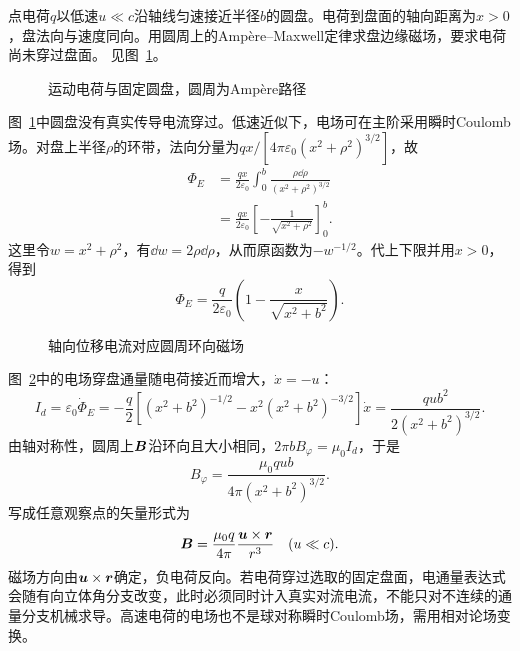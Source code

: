 \begin{example}[由位移电流求运动电荷的磁场]\label{ex:i4-e5}

点电荷$q$以低速$u\ll c$沿轴线匀速接近半径$b$的圆盘。电荷到盘面的轴向距离为$x>0$，盘法向与速度同向。用圆周上的Ampère--Maxwell定律求盘边缘磁场，要求电荷尚未穿过盘面。
 见图~\ref{fig:i4-e5-q}。
\end{example}

\begin{figure}[H]\centering
{}
\caption{运动电荷与固定圆盘，圆周为Ampère路径}\label{fig:i4-e5-q}
\end{figure}
\begin{solution}
图~\ref{fig:i4-e5-q}中圆盘没有真实传导电流穿过。低速近似下，电场可在主阶采用瞬时Coulomb场。对盘上半径$\rho$的环带，法向分量为$q x/[4\pi\varepsilon_0(x^2+\rho^2)^{3/2}]$，故
\[\begin{aligned}
\Phi_E&=\frac{qx}{2\varepsilon_0}\int_0^b
\frac{\rho\dd\rho}{(x^2+\rho^2)^{3/2}}\\
&=\frac{qx}{2\varepsilon_0}\left[-\frac1{\sqrt{x^2+\rho^2}}\right]_0^b.
\end{aligned}\]
这里令$w=x^2+\rho^2$，有$\dd w=2\rho\dd\rho$，从而原函数为$-w^{-1/2}$。代上下限并用$x>0$，得到
\[
\Phi_E=\frac q{2\varepsilon_0}\left(1-\frac{x}{\sqrt{x^2+b^2}}\right).
\]

\begin{figure}[H]\centering
{}
\caption{轴向位移电流对应圆周环向磁场}\label{fig:i4-e5-s}
\end{figure}

图~\ref{fig:i4-e5-s}中的电场穿盘通量随电荷接近而增大，$\dot x=-u$：
\[
I_d=\varepsilon_0\dot\Phi_E
=-\frac q2\left[(x^2+b^2)^{-1/2}-x^2(x^2+b^2)^{-3/2}\right]\dot x
=\frac{qub^2}{2(x^2+b^2)^{3/2}}.
\]
由轴对称性，圆周上$\bm{B}$沿环向且大小相同，$2\pi bB_\varphi=\mu_0I_d$，于是
\[
\boxed{B_\varphi=\frac{\mu_0qub}{4\pi(x^2+b^2)^{3/2}}}.
\]
写成任意观察点的矢量形式为
\[
\bm{B}=\frac{\mu_0q}{4\pi}\frac{\bm{u}\times\bm{r}}{r^3}
\quad(u\ll c).
\]
磁场方向由$\bm{u}\times\bm{r}$确定，负电荷反向。若电荷穿过选取的固定盘面，电通量表达式会随有向立体角分支改变，此时必须同时计入真实对流电流，不能只对不连续的通量分支机械求导。高速电荷的电场也不是球对称瞬时Coulomb场，需用相对论场变换。
\end{solution}


